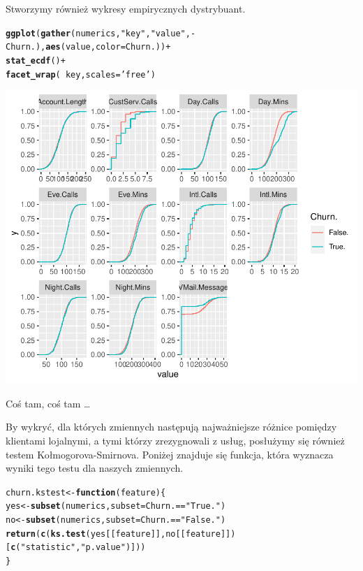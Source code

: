 \documentclass{article}\usepackage[]{graphicx}\usepackage[]{color}
\makeatletter
\def\maxwidth{ %
  \ifdim\Gin@nat@width>\linewidth
    \linewidth
  \else
    \Gin@nat@width
  \fi
}
\newcommand{\hlstr}[1]{\textcolor[rgb]{0.192,0.494,0.8}{#1}}%
\newcommand{\hlopt}[1]{\textcolor[rgb]{0,0,0}{#1}}%
\newcommand{\hlstd}[1]{\textcolor[rgb]{0.345,0.345,0.345}{#1}}%
\newcommand{\hlkwa}[1]{\textcolor[rgb]{0.161,0.373,0.58}{\textbf{#1}}}%
\newcommand{\hlkwb}[1]{\textcolor[rgb]{0.69,0.353,0.396}{#1}}%
\newcommand{\hlkwc}[1]{\textcolor[rgb]{0.333,0.667,0.333}{#1}}%
\newcommand{\hlkwd}[1]{\textcolor[rgb]{0.737,0.353,0.396}{\textbf{#1}}}%
\newenvironment{kframe}{%
 \def\at@end@of@kframe{}%
 \ifinner\ifhmode%
  \def\at@end@of@kframe{\end{minipage}}%
  \begin{minipage}{\columnwidth}%
 \fi\fi%
 \def\FrameCommand##1{\hskip\@totalleftmargin \hskip-\fboxsep
 \colorbox{shadecolor}{##1}\hskip-\fboxsep
     \hskip-\linewidth \hskip-\@totalleftmargin \hskip\columnwidth}%
 \MakeFramed {\advance\hsize-\width
   \@totalleftmargin\z@ \linewidth\hsize
   \@setminipage}}%
 {\par\unskip\endMakeFramed%
 \at@end@of@kframe}
\newenvironment{knitrout}{}{} %
\makeatother
\begin{document}
Stworzymy również wykresy empirycznych dystrybuant.
\begin{knitrout}
\color{fgcolor}\begin{kframe}
\begin{alltt}
\hlkwd{ggplot}\hlstd{(}\hlkwd{gather}\hlstd{(numerics,} \hlstr{"key"}\hlstd{,} \hlstr{"value"}\hlstd{,} \hlopt{-}\hlstd{Churn.),} \hlkwd{aes}\hlstd{(value,} \hlkwc{color}\hlstd{=Churn.))} \hlopt{+}
  \hlkwd{stat_ecdf}\hlstd{()} \hlopt{+}
  \hlkwd{facet_wrap}\hlstd{(}\hlopt{~}\hlstd{key,} \hlkwc{scales}\hlstd{=}\hlstr{'free'}\hlstd{)}
\end{alltt}
\end{kframe}

{\centering \includegraphics[width=\maxwidth]{figure/Dystrybuanty_empiryczne-1} 

}



\end{knitrout}
Coś tam, coś tam \ldots

By wykryć, dla których zmiennych następują najważniejsze różnice pomiędzy klientami lojalnymi, a tymi którzy zrezygnowali z usług, posłużymy się również testem Kołmogorova-Smirnova. Poniżej znajduje się funkcja, która wyznacza wyniki tego testu dla naszych zmiennych. 
\begin{knitrout}
\color{fgcolor}\begin{kframe}
\begin{alltt}
\hlstd{churn.kstest} \hlkwb{<-} \hlkwa{function}\hlstd{(}\hlkwc{feature}\hlstd{) \{}
  \hlstd{yes} \hlkwb{<-} \hlkwd{subset}\hlstd{(numerics,} \hlkwc{subset}\hlstd{=Churn.}\hlopt{==}\hlstr{"True."}\hlstd{)}
  \hlstd{no} \hlkwb{<-} \hlkwd{subset}\hlstd{(numerics,} \hlkwc{subset}\hlstd{=Churn.}\hlopt{==}\hlstr{"False."}\hlstd{)}
  \hlkwd{return}\hlstd{(}\hlkwd{c}\hlstd{(}\hlkwd{ks.test}\hlstd{(yes[[feature]], no[[feature]])[}\hlkwd{c}\hlstd{(}\hlstr{"statistic"}\hlstd{,} \hlstr{"p.value"}\hlstd{)]))}
\hlstd{\}}
\end{alltt}
\end{kframe}
\end{knitrout}
\end{document}

